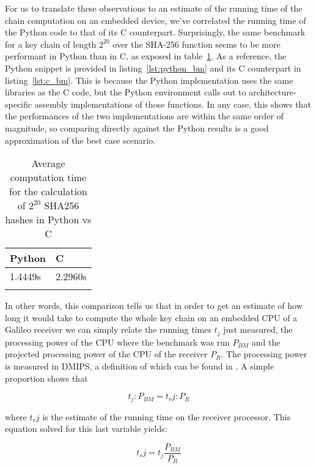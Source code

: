For us to translate these observations to an estimate of the running time of the
chain computation on an embedded device, we've correlated the running time of
the Python code to that of its C counterpart. Surprisingly, the same benchmark
for a key chain of length $2^{20}$ over the SHA-256 function seems to be more
performant in Python than in C, as exposed in table~\ref{table:bm_c_python}. As a
reference, the Python snippet is provided in listing~\ref{lst:python_bm} and its C
counterpart in listing~\ref{lst:c_bm}. This is because the Python implementation
uses the same libraries as the C code, but the Python environment calls out to
architecture-specific assembly implementations of those functions. In any case,
this shows that the performances of the two implementations are within the same
order of magnitude, so comparing directly against the Python results is a good
approximation of the best case scenario.





\begin{longtable}[]{@{}ll@{}}
\toprule
Python & C\tabularnewline
\midrule
\endhead
1.4449s & 2.2960s\tabularnewline
\bottomrule
\caption{Average computation time for the calculation of $2^{20}$ SHA256 hashes
in Python vs C}
\label{table:bm_c_python}
\end{longtable}

In other words, this comparison tells us that in order to get an estimate of how
long it would take to compute the whole key chain on an embedded CPU of a
Galileo receiver we can simply relate the running times $t_j$ just measured, the
processing power of the CPU where the benchmark was run $P_{BM}$ and the
projected processing power of the CPU of the receiver $P_R$. The processing
power is measured in DMIPS, a definition of which can be found in \cite{dmips}.
A simple proportion shows that

\begin{equation}
  t_j : P_{BM} = t_rj : P_R
\end{equation}

where $t_rj$ is the estimate of the running time on the receiver processor. This
equation solved for this last variable yields:

\[
  t_rj = t_j \frac{P_{BM}}{P_R}
\]


